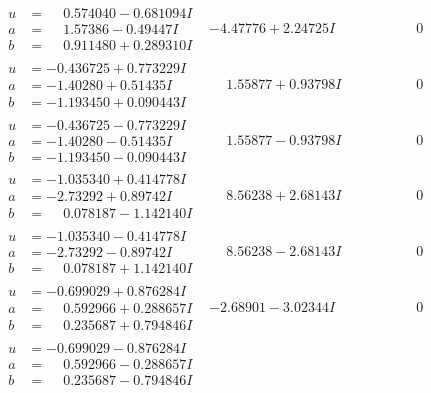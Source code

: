 \documentclass[1p]{elsarticle_modified}
\theoremstyle{definition}
\begin{document}
$$\begin{array}{c|c|c}
\begin{aligned}
u &= \phantom{-}0.574040 - 0.681094 I \\
a &= \phantom{-}1.57386 - 0.49447 I \\
b &= \phantom{-}0.911480 + 0.289310 I\end{aligned}
 & -4.47776 + 2.24725 I & \phantom{-0.000000 } 0 \\ \hline\begin{aligned}
u &= -0.436725 + 0.773229 I \\
a &= -1.40280 + 0.51435 I \\
b &= -1.193450 + 0.090443 I\end{aligned}
 & \phantom{-}1.55877 + 0.93798 I & \phantom{-0.000000 } 0 \\ \hline\begin{aligned}
u &= -0.436725 - 0.773229 I \\
a &= -1.40280 - 0.51435 I \\
b &= -1.193450 - 0.090443 I\end{aligned}
 & \phantom{-}1.55877 - 0.93798 I & \phantom{-0.000000 } 0 \\ \hline\begin{aligned}
u &= -1.035340 + 0.414778 I \\
a &= -2.73292 + 0.89742 I \\
b &= \phantom{-}0.078187 - 1.142140 I\end{aligned}
 & \phantom{-}8.56238 + 2.68143 I & \phantom{-0.000000 } 0 \\ \hline\begin{aligned}
u &= -1.035340 - 0.414778 I \\
a &= -2.73292 - 0.89742 I \\
b &= \phantom{-}0.078187 + 1.142140 I\end{aligned}
 & \phantom{-}8.56238 - 2.68143 I & \phantom{-0.000000 } 0 \\ \hline\begin{aligned}
u &= -0.699029 + 0.876284 I \\
a &= \phantom{-}0.592966 + 0.288657 I \\
b &= \phantom{-}0.235687 + 0.794846 I\end{aligned}
 & -2.68901 - 3.02344 I & \phantom{-0.000000 } 0 \\ \hline\begin{aligned}
u &= -0.699029 - 0.876284 I \\
a &= \phantom{-}0.592966 - 0.288657 I \\
b &= \phantom{-}0.235687 - 0.794846 I\end{aligned}

\end{array}$$
\end{document}

